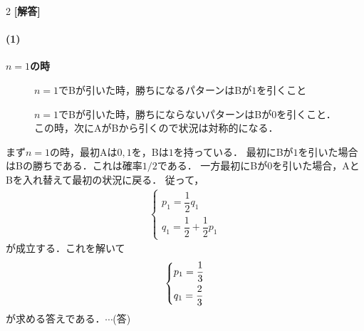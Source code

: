 \documentclass[../../main.tex]{subfiles}
\begin{document}
\setcounter{equation}{0}
\begin{oframed}
  
\end{oframed}
\setlength{\columnseprule}{0.4pt}
\begin{multicols}{2}
  {\bf [解答]}
  \paragraph{(1)}

  \textbf{$n=1$の時}

  \begin{figure}[H]
    \centering
    \caption{$n=1$でBが引いた時，勝ちになるパターンはBが$1$を引くこと}
  \end{figure}

  \begin{figure}[H]
    \centering
    \caption{$n=1$でBが引いた時，勝ちにならないパターンはBが$0$を引くこと．
    この時，次にAがBから引くので状況は対称的になる．}
  \end{figure}

  まず$n=1$の時，最初Aは$0,1$を，Bは$1$を持っている．
  最初にBが$1$を引いた場合はBの勝ちである．これは確率$1/2$である．
  一方最初にBが$0$を引いた場合，AとBを入れ替えて最初の状況に戻る．
  従って，
  \begin{align}
    \begin{cases}
      p_1 = \dfrac{1}{2}q_1             \\
      q_1 = \dfrac{1}{2}+\dfrac{1}{2}p_1
    \end{cases}
  \end{align}
  が成立する．これを解いて
  \begin{align}
    \begin{dcases}
      p_1 = \dfrac{1}{3} \\
      q_1 = \dfrac{2}{3}
    \end{dcases}
  \end{align}
  が求める答えである．$\cdots$(答)


\end{multicols}
\end{document}
